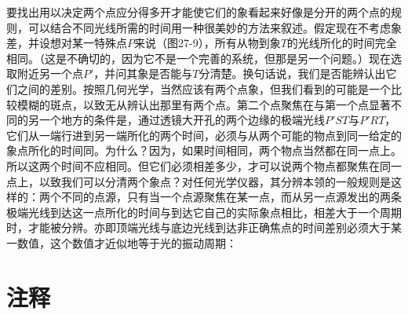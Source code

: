 \documentclass[12pt,oneside]{book}
\begin{document}
\begin{common-format}
要找出用以决定两个点应分得多开才能使它们的象看起来好像是分开的两个点的规则，可以结合不同光线所需的时间用一种很美妙的方法来叙述。假定现在不考虑象差，并设想对某一特殊点$P$来说（图27-9），所有从物到象$T$的光线所化的时间完全相同。（这是不确切的，因为它不是一个完善的系统，但那是另一个问题。）现在选取附近另一个点$P'$，并问其象是否能与$T$分清楚。换句话说，我们是否能辨认出它们之间的差别。按照几何光学，当然应该有两个点象，但我们看到的可能是一个比较模糊的斑点，以致无从辨认出那里有两个点。第二个点聚焦在与第一个点显著不同的另一个地方的条件是，通过透镜大开孔的两个边缘的极端光线$P'ST$与$P'RT$，它们从一端行进到另一端所化的两个时间，必须与从两个可能的物点到同一给定的象点所化的时间同。为什么？因为，如果时间相同，两个物点当然都在同一点上。所以这两个时间不应相同。但它们必须相差多少，才可以说两个物点都聚焦在同一点上，以致我们可以分清两个象点？对任何光学仪器，其分辨本领的一般规则是这样的：两个不同的点源，只有当一个点源聚焦在某一点，而从另一点源发出的两条极端光线到达这一点所化的时间与到达它自己的实际象点相比，相差大于一个周期时，才能被分辨。亦即顶端光线与底边光线到达非正确焦点的时间差别必须大于某一数值，这个数值才近似地等于光的振动周期：



\section{注释}
\showendnotes




\end{common-format}
\end{document}
